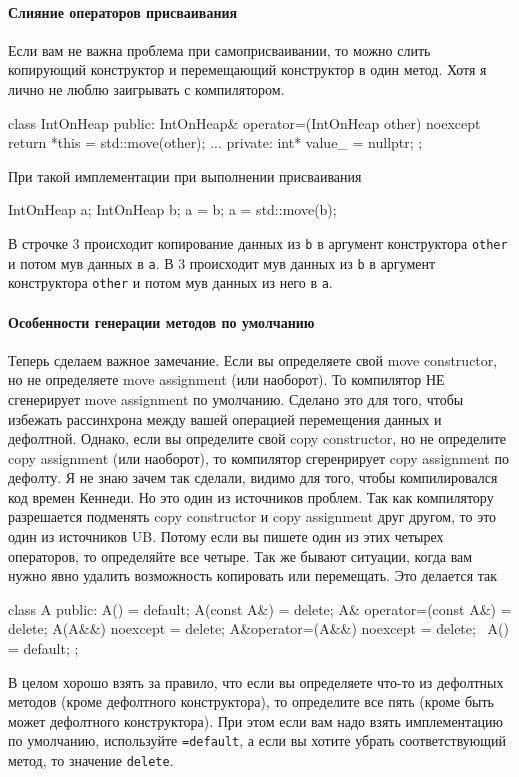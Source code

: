 \paragraph{Слияние операторов присваивания}
Если вам не важна проблема при самоприсваивании, то можно слить копирующий конструктор и перемещающий конструктор в один метод.
Хотя я лично не люблю заигрывать с компилятором.
\begin{cppcode}
class IntOnHeap {
public:
  IntOnHeap& operator=(IntOnHeap other) noexcept {
    return *this = std::move(other);
  }
  ...
private:
  int* value_ = nullptr;
};
\end{cppcode}
При такой имплементации при выполнении присваивания
\begin{cppcode}
IntOnHeap a;
IntOnHeap b;
a = b;
a = std::move(b);
\end{cppcode}
В строчке $3$ происходит копирование данных из \verb"b" в аргумент конструктора \verb"other" и потом мув данных в \verb"a".
В $3$ происходит мув данных из \verb"b" в аргумент конструктора \verb"other" и потом мув данных из него в \verb"a".

\paragraph{Особенности генерации методов по умолчанию}

Теперь сделаем важное замечание.
Если вы определяете свой move constructor, но не определяете move assignment (или наоборот).
То компилятор НЕ сгенерирует move assignment по умолчанию.
Сделано это для того, чтобы избежать рассинхрона между вашей операцией перемещения данных и дефолтной.
Однако, если вы определите свой copy constructor, но не определите copy assignment (или наоборот), то компилятор сгеренрирует copy assignment по дефолту.
Я не знаю зачем так сделали, видимо для того, чтобы компилировался код времен Кеннеди.
Но это один из источников проблем.
Так как компилятору разрешается подменять copy constructor и copy assignment друг другом, то это один из источников UB.
Потому если вы пишете один из этих четырех операторов, то определяйте все четыре.
Так же бывают ситуации, когда вам нужно явно удалить возможность копировать или перемещать.
Это делается так
\begin{cppcode}
class A {
public:
 A() = default;
 A(const A&) = delete;
 A& operator=(const A&) = delete;
 A(A&&) noexcept = delete;
 A&operator=(A&&) noexcept = delete;
 ~A() = default;
};
\end{cppcode}
В целом хорошо взять за правило, что если вы определяете что-то из дефолтных методов (кроме дефолтного конструктора), то определите все пять (кроме быть может дефолтного конструктора).
При этом если вам надо взять имплементацию по умолчанию, используйте \verb"=default", а если вы хотите убрать соответствующий метод, то значение \verb"delete".

